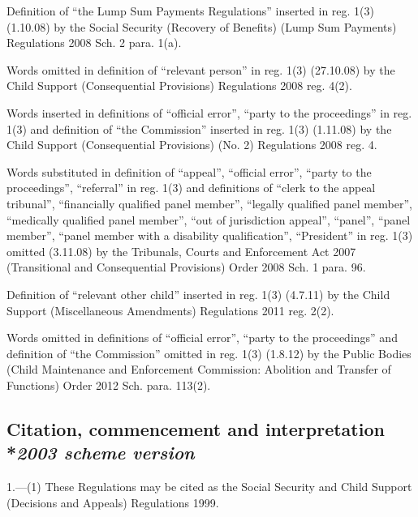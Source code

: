 \documentclass[12pt,a4paper]{article}
\begin{document}
{Definition of ``the Lump Sum Payments Regulations'' inserted in reg. 1(3) (1.10.08) by the Social Security (Recovery of Benefits) (Lump Sum Payments) Regulations 2008 Sch. 2 para. 1(a).

Words omitted in definition of ``relevant person'' in reg. 1(3) (27.10.08) by the Child Support (Consequential Provisions) Regulations 2008 reg. 4(2).

Words inserted in definitions of ``official error'', ``party to the proceedings'' in reg. 1(3) and definition of ``the Commission'' inserted in reg. 1(3) (1.11.08) by the Child Support (Consequential Provisions) (No. 2) Regulations 2008 reg. 4.

Words substituted in definition of ``appeal'', ``official error'', ``party to the proceedings'', ``referral'' in reg. 1(3) and definitions of ``clerk to the appeal tribunal'', ``financially qualified panel member'', ``legally qualified panel member'', ``medically qualified panel member'', ``out of jurisdiction appeal'', ``panel'', ``panel member'', ``panel member with a disability qualification'', ``President'' in reg. 1(3) omitted (3.11.08) by the Tribunals, Courts and Enforcement Act 2007 (Transitional and Consequential Provisions) Order 2008 Sch. 1 para. 96.

Definition of ``relevant other child'' inserted in reg. 1(3) (4.7.11) by the Child Support (Miscellaneous Amendments) Regulations 2011 reg. 2(2).

Words omitted in definitions of ``official error'', ``party to the proceedings'' and definition of ``the Commission'' omitted in reg. 1(3) (1.8.12) by the Public Bodies (Child Maintenance and Enforcement Commission: Abolition and Transfer of Functions) Order 2012 Sch. para. 113(2).
}

\subsection[1. Citation, commencement and interpretation --- \emph{2003 scheme version}]{Citation, commencement and interpretation\\*\emph{2003 scheme version}}

1.—(1) These Regulations may be cited as the Social Security and Child Support (Decisions and Appeals) Regulations 1999.
\end{document}
